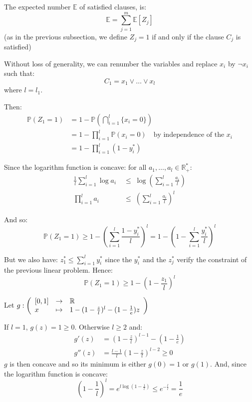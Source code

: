 The expected number $\mathbb{E}$ of satisfied clauses, is:
\[ \mathbb{E} = \sum_{j=1}^{m}{\mathbb{E}[Z_j]} \]
(as in the previous subsection, we define $Z_j = 1$ if and only if the clause $C_j$ is
satisfied)

Without loss of generality, we can renumber the variables and replace $x_i$ by $\neg
x_i$ such that:
\[ C_1 = x_1 \vee \dots \vee x_l \]
where $l = l_1$.

Then:
\begin{align*}
\mathbb{P} (Z_1 = 1) &= 1 - \mathbb{P} \left( \bigcap_{i=1}^l \{ x_i = 0 \} \right) \\
&= 1- \prod_{i=1}^l \mathbb{P}(x_i = 0) \quad \text{by independence of the $x_i$} \\
&= 1 - \prod_{i=1}^l (1 - y^*_i)
\end{align*}

Since the logarithm function is concave: for all $a_1, \dots, a_l \in \mathbb{R^*_+}$:
\begin{align*}
\frac{1}{l} \sum_{i=1}^l \log a_i \; &\le \; \log \left( \sum_{i=1}^{l}
\frac{a_i}{l} \right) \\
\prod_{i=1}^l a_i \; &\le \; \left( \sum_{i=1}^{l} \frac{a_i}{l} \right) ^ l
\end{align*}

And so:
\[
\mathbb{P} (Z_1 = 1) \ge 1 - \left( \sum_{i=1}^{l} \frac{1 - y^*_i}{l} \right) ^
l = 1 - \left(1 - \sum_{i=1}^{l} \frac{y^*_i}{l} \right) ^ l 
\]

But we also have: $z^*_1 \le \sum_{i=1}^{l} y^*_i$ since the $y^*_i$ and the $z^*_j$
verify the constraint of the previous linear problem. Hence:
\begin{equation} \label{eq:probaZ1}
 \mathbb{P} (Z_1 = 1) \ge 1 - \left( 1 - \frac{z_1}{l} \right)^l
\end{equation}

Let $g : \left( \begin{array}{l c l}
    [0,1] & \rightarrow & \mathbb{R}\\
    x & \mapsto & 1- (1-\frac{z}{l})^l - (1-\frac{1}{e}) z
    \end{array} \right)$
    
If $l=1$, $g(z) = 1 \ge 0$. Otherwise $l \ge 2$ and:
\begin{align*}
g'(z) &= \left( 1 - \frac{z}{l} \right)^{l-1} - \left(1 - \frac{1}{e} \right) \\
g''(z) &= \frac{l-1}{l} \left( 1 - \frac{z}{l} \right)^{l-2} \ge 0
\end{align*}
$g$ is then concave and so its minimum is either $g(0) = 1$ or $g(1)$. And, since
the logarithm function is concave:
\begin{equation} \label{eq:classicIneq}
 \left(1 - \frac{1}{l}\right)^l = e^{l \log(1-\frac{1}{l})} \le e^{-\frac{l}{l}} =
\frac{1}{e} 
\end{equation}

